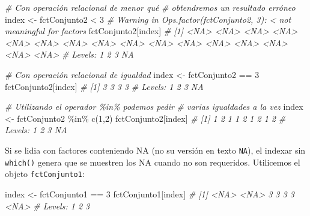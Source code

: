\documentclass[
]{article}
\newenvironment{Shaded}{\begin{snugshade}}{\end{snugshade}}
\newcommand{\CommentTok}[1]{\textcolor[rgb]{0.56,0.35,0.01}{\textit{#1}}}
\newcommand{\DecValTok}[1]{\textcolor[rgb]{0.00,0.00,0.81}{#1}}
\newcommand{\FunctionTok}[1]{\textcolor[rgb]{0.00,0.00,0.00}{#1}}
\newcommand{\NormalTok}[1]{#1}
\newcommand{\OtherTok}[1]{\textcolor[rgb]{0.56,0.35,0.01}{#1}}
\newcommand{\SpecialCharTok}[1]{\textcolor[rgb]{0.00,0.00,0.00}{#1}}
\theoremstyle{definition}
\theoremstyle{definition}
\theoremstyle{definition}
\theoremstyle{definition}
\theoremstyle{remark}
\begin{document}
\begin{Shaded}
\begin{Highlighting}[]
\CommentTok{\# Con operación relacional de menor qué}
\CommentTok{\# obtendremos un resultado erróneo}
\NormalTok{index }\OtherTok{\textless{}{-}}\NormalTok{ fctConjunto2 }\SpecialCharTok{\textless{}} \DecValTok{3}
\CommentTok{\# Warning in Ops.factor(fctConjunto2, 3): \textquotesingle{}\textless{}\textquotesingle{} not meaningful for factors}
\NormalTok{fctConjunto2[index]}
\CommentTok{\#  [1] \textless{}NA\textgreater{} \textless{}NA\textgreater{} \textless{}NA\textgreater{} \textless{}NA\textgreater{} \textless{}NA\textgreater{} \textless{}NA\textgreater{} \textless{}NA\textgreater{} \textless{}NA\textgreater{} \textless{}NA\textgreater{} \textless{}NA\textgreater{} \textless{}NA\textgreater{} \textless{}NA\textgreater{} \textless{}NA\textgreater{} \textless{}NA\textgreater{} \textless{}NA\textgreater{} \textless{}NA\textgreater{}}
\CommentTok{\# Levels: 1 2 3 NA}

\CommentTok{\# Con operación relacional de igualdad}
\NormalTok{index }\OtherTok{\textless{}{-}}\NormalTok{ fctConjunto2 }\SpecialCharTok{==} \DecValTok{3}
\NormalTok{fctConjunto2[index]}
\CommentTok{\# [1] 3 3 3 3}
\CommentTok{\# Levels: 1 2 3 NA}

\CommentTok{\# Utilizando el operador \%in\% podemos pedir }
\CommentTok{\# varias igualdades a la vez}
\NormalTok{index }\OtherTok{\textless{}{-}}\NormalTok{ fctConjunto2 }\SpecialCharTok{\%in\%} \FunctionTok{c}\NormalTok{(}\DecValTok{1}\NormalTok{,}\DecValTok{2}\NormalTok{)}
\NormalTok{fctConjunto2[index]}
\CommentTok{\# [1] 1 2 1 1 2 1 2 1 2}
\CommentTok{\# Levels: 1 2 3 NA}
\end{Highlighting}
\end{Shaded}

Si se lidia con factores conteniendo NA (no su versión en texto \texttt{NA}), el indexar sin \texttt{which()} genera que se muestren los NA cuando no son requeridos. Utilicemos el objeto \texttt{fctConjunto1}:

\begin{Shaded}
\begin{Highlighting}[]
\NormalTok{index }\OtherTok{\textless{}{-}}\NormalTok{ fctConjunto1 }\SpecialCharTok{==} \DecValTok{3}
\NormalTok{fctConjunto1[index]}
\CommentTok{\# [1] \textless{}NA\textgreater{} \textless{}NA\textgreater{} 3    3    3    3    \textless{}NA\textgreater{}}
\CommentTok{\# Levels: 1 2 3}
\end{Highlighting}
\end{Shaded}
\end{document}

